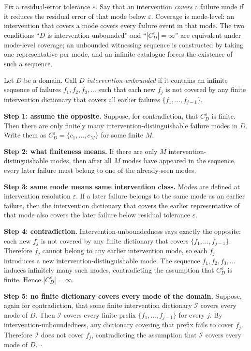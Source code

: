 \documentclass[
]{article}
\begin{document}
Fix a residual-error tolerance \(\varepsilon\). Say that an intervention
\emph{covers} a failure mode if it reduces the residual error of that
mode below \(\varepsilon\). Coverage is mode-level: an intervention that
covers a mode covers every failure event in that mode. The two
conditions ``\(D\) is intervention-unbounded'' and
``\(|C_D^{\varepsilon}| = \infty\)'' are equivalent under mode-level
coverage; an unbounded witnessing sequence is constructed by taking one
representative per mode, and an infinite catalogue forces the existence
of such a sequence.

Let \(D\) be a domain. Call \(D\) \emph{intervention-unbounded} if it
contains an infinite sequence of failures \(f_1, f_2, f_3, \ldots\) such
that each new \(f_j\) is not covered by any finite intervention
dictionary that covers all earlier failures
\(\{f_1, \ldots, f_{j-1}\}\).

\textbf{Step 1: assume the opposite.} Suppose, for contradiction, that
\(C_D^{\varepsilon}\) is finite. Then there are only finitely many
intervention-distinguishable failure modes in \(D\). Write them as
\(C_D^{\varepsilon} = \{c_1, \ldots, c_M\}\) for some finite \(M\).

\textbf{Step 2: what finiteness means.} If there are only \(M\)
intervention-distinguishable modes, then after all \(M\) modes have
appeared in the sequence, every later failure must belong to one of the
already-seen modes.

\textbf{Step 3: same mode means same intervention class.} Modes are
defined at intervention resolution \(\varepsilon\). If a later failure
belongs to the same mode as an earlier failure, then the intervention
dictionary that covers the earlier representative of that mode also
covers the later failure below residual tolerance \(\varepsilon\).

\textbf{Step 4: contradiction.} Intervention-unboundedness says exactly
the opposite: each new \(f_j\) is not covered by any finite dictionary
that covers \(\{f_1, \ldots, f_{j-1}\}\). Therefore \(f_j\) cannot
belong to any earlier intervention mode, so each \(f_j\) introduces a
new intervention-distinguishable mode. The sequence
\(f_1, f_2, f_3, \ldots\) induces infinitely many such modes,
contradicting the assumption that \(C_D^{\varepsilon}\) is finite. Hence
\(|C_D^{\varepsilon}| = \infty\).

\textbf{Step 5: no finite dictionary covers every mode of the domain.}
Suppose, again for contradiction, that some finite intervention
dictionary \(\mathcal{I}\) covers every mode of \(D\). Then
\(\mathcal{I}\) covers every finite prefix \(\{f_1, \ldots, f_{j-1}\}\)
for every \(j\). By intervention-unboundedness, any dictionary covering
that prefix fails to cover \(f_j\). Therefore \(\mathcal{I}\) does not
cover \(f_j\), contradicting the assumption that \(\mathcal{I}\) covers
every mode of \(D\). \(\square\)
\end{document}
